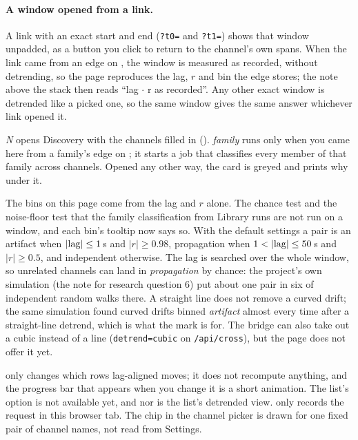 \paragraph{A window opened from a link.} A link with an exact start and end
(\texttt{?t0=} and \texttt{?t1=}) shows that window unpadded, as a button you click to return to
the channel's own spans. When the link came from an edge on , the
window is measured as recorded, without detrending, so the page reproduces the lag, $r$ and bin
the edge stores; the note above the stack then reads ``lag $\cdot$ r as recorded''. Any other
exact window is detrended like a picked one, so the same window gives the same answer whichever
link opened it.

 \emph{N}  opens Discovery with the channels
filled in ().  \emph{family}  runs only when you came here from a family's edge on ; it
starts a job that classifies every member of that family across channels. Opened any other
way, the card is greyed and prints why under it.

\begin{watchout}
The bins on this page come from the lag and $r$ alone. The chance test and the noise-floor
test that the family classification from Library runs are not run on a window, and each bin's
tooltip now says so. With the default settings a pair is an artifact when
$|{\rm lag}| \le 1$\,s and $|r| \ge 0.98$, propagation when $1 < |{\rm lag}| \le 50$\,s and
$|r| \ge 0.5$, and independent otherwise. The lag is searched over the whole window, so
unrelated channels can land in \emph{propagation} by chance: the project's own simulation (the
note for research question 6) put about one pair in six of independent random walks there. A
straight line does not remove a curved drift; the same simulation found curved drifts binned
\emph{artifact} almost every time after a straight-line detrend, which is what the  mark is for. The bridge can also take out a cubic instead of a line
(\texttt{detrend=cubic} on \texttt{/api/cross}), but the page does not offer it yet.
\end{watchout}

\begin{watchout}
 only changes which rows lag-aligned moves; it does not recompute anything, and the
progress bar that appears when you change it is a short animation. The  list's
 option is not available yet, and nor is the 
list's detrended view.  only records the request in
this browser tab. The  chip in the channel picker is drawn for one fixed
pair of channel names, not read from Settings.
\end{watchout}

